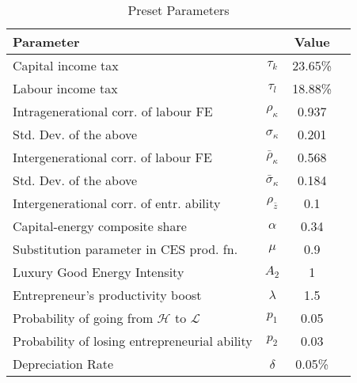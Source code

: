 \documentclass[12pt,a4paper]{article}
\begin{document}
  \begin{table}[ht]
\centering %

\caption{Preset Parameters}

\begin{tabular}{l c c c } %

\hline\hline %
 Parameter &   &  Value \\ [0.5ex] %
\hline %
Capital income tax  & $\tau_k$ & 23.65\%\\
Labour income tax & $\tau_l$ & 18.88\% \\ %
Intragenerational corr. of labour FE & $\rho_{\kappa}$ & 0.937\\
Std. Dev. of the above & $\sigma_{\kappa}$ & 0.201 \\
Intergenerational corr. of labour FE & $\bar{\rho}_{\kappa}$ & 0.568\\
Std. Dev. of the above & $\bar{\sigma}_{\kappa}$ & 0.184 \\
Intergenerational corr. of entr. ability & $\rho_{\bar{z}}$ & 0.1\\
Capital-energy composite share & $\alpha$ & 0.34  \\
Substitution parameter in CES prod. fn. & $\mu$ & 0.9\\
Luxury Good Energy Intensity & $A_2$ & 1\\
Entrepreneur's productivity boost & $\lambda$ & 1.5 \\
Probability of going from $\mathcal{H}$ to $\mathcal{L}$ & $p_1$ & 0.05 \\
Probability of losing entrepreneurial ability & $p_2$ & 0.03\\

Depreciation Rate & $\delta$ & 0.05\%\\[1ex] %

\hline 

\end{tabular}
\label{fig:presetparameters}
\captionsetup{font=footnotesize}
\end{table}
\end{document}
